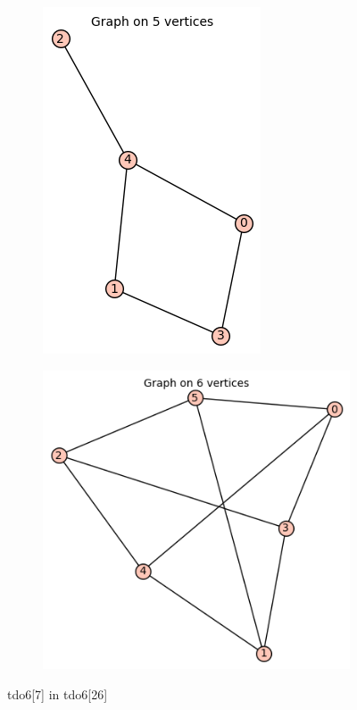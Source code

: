 \documentclass[12pt, a4paper]{article}
\begin{document}
\begin{center}
\begin{figure}[!htb]
\centering
\begin{subfigure}{0.5\textwidth}
  \centering
  \includegraphics[width=0.3\linewidth]{tdo6[7]}
\end{subfigure}%
\begin{subfigure}{0.5\textwidth}
  \centering
  \includegraphics[width=0.44\linewidth]{tdo6[26]}
\end{subfigure}
\caption{tdo6[7] in tdo6[26]}
\label{fig:test}
\end{figure}


\end{center}
\end{document}
